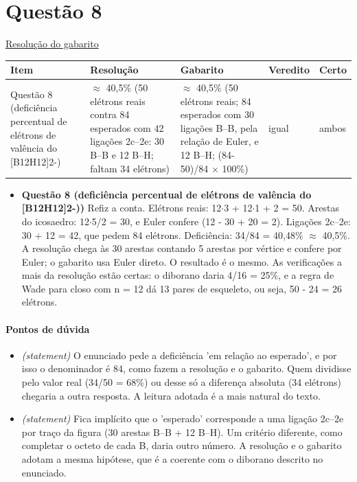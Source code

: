 \documentclass{article}%
\begin{document}
\section*{Questão 8}%
\href{https://poliedroresolve.sistemapoliedro.com.br/vestibulares/ime/2026/ime-2-fase-dia-3-25-10-2025-2-fase-dia-3/dissertativa-8-quimica-2-fase-dia-3-ime-2026}{Resolução do gabarito}\par\smallskip%
\begin{longtable}{@{}p{} p{} p{} p{} p{}@{}}\toprule Item & Resolução & Gabarito & Veredito & Certo \\ \midrule
Questão 8 (deficiência percentual de elétrons de valência do {[}B12H12{]}2-) & $\approx$ 40,5\% (50 elétrons reais contra 84 esperados com 42 ligações 2c--2e: 30 B--B e 12 B--H; faltam 34 elétrons) & $\approx$ 40,5\% (50 elétrons reais; 84 esperados com 30 ligações B--B, pela relação de Euler, e 12 B--H; (84-50)/84 $\times$ 100\%) & igual & ambos \\
\bottomrule\end{longtable}%
\begin{itemize}%
\item%
\textbf{Questão 8 (deficiência percentual de elétrons de valência do {[}B12H12{]}2-))} Refiz a conta. Elétrons reais: 12$\cdot$3 + 12$\cdot$1 + 2 = 50. Arestas do icosaedro: 12$\cdot$5/2 = 30, e Euler confere (12 - 30 + 20 = 2). Ligações 2c--2e: 30 + 12 = 42, que pedem 84 elétrons. Deficiência: 34/84 = 40,48\% $\approx$ 40,5\%. A resolução chega às 30 arestas contando 5 arestas por vértice e confere por Euler; o gabarito usa Euler direto. O resultado é o mesmo. As verificações a mais da resolução estão certas: o diborano daria 4/16 = 25\%, e a regra de Wade para closo com n = 12 dá 13 pares de esqueleto, ou seja, 50 - 24 = 26 elétrons.%
\end{itemize}%
\paragraph{Pontos de dúvida}%
\begin{itemize}%
\item%
\textit{(statement)} O enunciado pede a deficiência 'em relação ao esperado', e por isso o denominador é 84, como fazem a resolução e o gabarito. Quem dividisse pelo valor real (34/50 = 68\%) ou desse só a diferença absoluta (34 elétrons) chegaria a outra resposta. A leitura adotada é a mais natural do texto.%
\item%
\textit{(statement)} Fica implícito que o 'esperado' corresponde a uma ligação 2c--2e por traço da figura (30 arestas B--B + 12 B--H). Um critério diferente, como completar o octeto de cada B, daria outro número. A resolução e o gabarito adotam a mesma hipótese, que é a coerente com o diborano descrito no enunciado.%
\end{itemize}%
\end{document}
